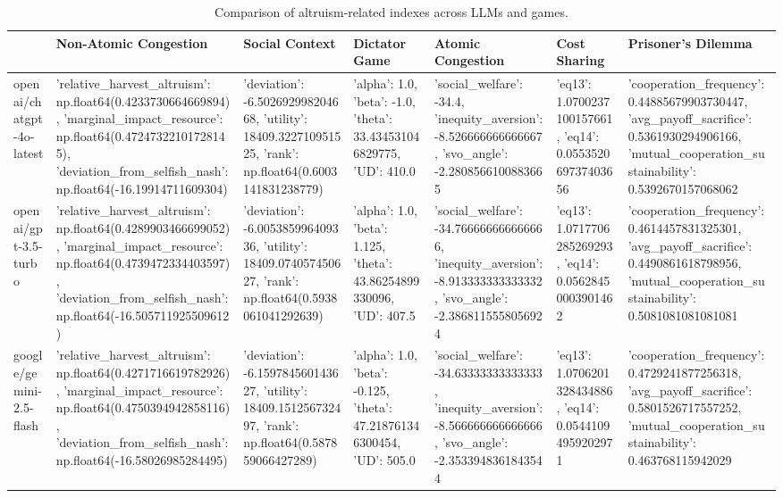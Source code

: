 \begin{table}
\caption{Comparison of altruism-related indexes across LLMs and games.}
\label{tab:altruism_indexes}
\begin{tabular}{lllllll}
\toprule
 & Non-Atomic Congestion & Social Context & Dictator Game & Atomic Congestion & Cost Sharing & Prisoner's Dilemma \\
\midrule
openai/chatgpt-4o-latest & {'relative_harvest_altruism': np.float64(0.4233730664669894), 'marginal_impact_resource': np.float64(0.47247322101728145), 'deviation_from_selfish_nash': np.float64(-16.19914711609304)} & {'deviation': -6.502692998204668, 'utility': 18409.322710951525, 'rank': np.float64(0.6003141831238779)} & {'alpha': 1.0, 'beta': -1.0, 'theta': 33.434531046829775, 'UD': 410.0} & {'social_welfare': -34.4, 'inequity_aversion': -8.526666666666667, 'svo_angle': -2.2808566100883665} & {'eq13': 1.0700237100157661, 'eq14': 0.055352069737403656} & {'cooperation_frequency': 0.44885679903730447, 'avg_payoff_sacrifice': 0.5361930294906166, 'mutual_cooperation_sustainability': 0.5392670157068062} \\
openai/gpt-3.5-turbo & {'relative_harvest_altruism': np.float64(0.4289903466699052), 'marginal_impact_resource': np.float64(0.4739472334403597), 'deviation_from_selfish_nash': np.float64(-16.505711925509612)} & {'deviation': -6.005385996409336, 'utility': 18409.074057450627, 'rank': np.float64(0.5938061041292639)} & {'alpha': 1.0, 'beta': 1.125, 'theta': 43.86254899330096, 'UD': 407.5} & {'social_welfare': -34.766666666666666, 'inequity_aversion': -8.913333333333332, 'svo_angle': -2.3868115558056924} & {'eq13': 1.0717706285269293, 'eq14': 0.05628450003901462} & {'cooperation_frequency': 0.4614457831325301, 'avg_payoff_sacrifice': 0.4490861618798956, 'mutual_cooperation_sustainability': 0.5081081081081081} \\
google/gemini-2.5-flash & {'relative_harvest_altruism': np.float64(0.4271716619782926), 'marginal_impact_resource': np.float64(0.4750394942858116), 'deviation_from_selfish_nash': np.float64(-16.58026985284495)} & {'deviation': -6.159784560143627, 'utility': 18409.151256732497, 'rank': np.float64(0.587859066427289)} & {'alpha': 1.0, 'beta': -0.125, 'theta': 47.218761346300454, 'UD': 505.0} & {'social_welfare': -34.63333333333333, 'inequity_aversion': -8.566666666666666, 'svo_angle': -2.3533948361843544} & {'eq13': 1.0706201328434886, 'eq14': 0.05441094959202971} & {'cooperation_frequency': 0.4729241877256318, 'avg_payoff_sacrifice': 0.5801526717557252, 'mutual_cooperation_sustainability': 0.463768115942029} \\

\end{tabular}
\end{table}

